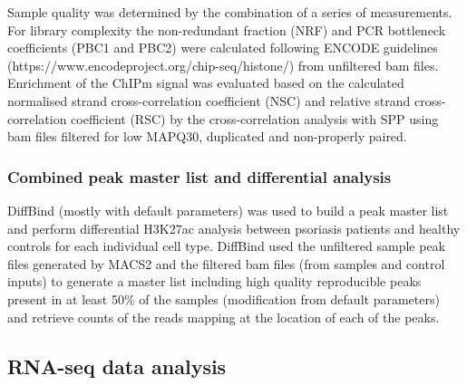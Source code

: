 Sample quality was determined by the combination of a series of measurements. For library complexity the non-redundant fraction (NRF) and PCR bottleneck coefficients (PBC1 and PBC2) were calculated following ENCODE guidelines (https://www.encodeproject.org/chip-seq/histone/) from unfiltered bam files.  Enrichment of the ChIPm signal was evaluated based on the calculated normalised strand cross-correlation coefficient (NSC) and relative strand cross-correlation coefficient (RSC) by the cross-correlation analysis with SPP using bam files filtered for low MAPQ30, duplicated and non-properly paired.

\subsubsection{Combined peak master list and differential analysis}
DiffBind (mostly with default parameters) was used to build a peak master list and perform differential H3K27ac analysis between psoriasis patients and healthy controls for each individual cell type. DiffBind used the unfiltered sample peak files generated by MACS2 and the filtered bam files (from samples and control inputs) to generate a master list including high quality reproducible peaks present in at least 50\% of the samples (modification from default parameters) and retrieve counts of the reads mapping at the location of each of the peaks.


\subsection{RNA-seq data analysis}

